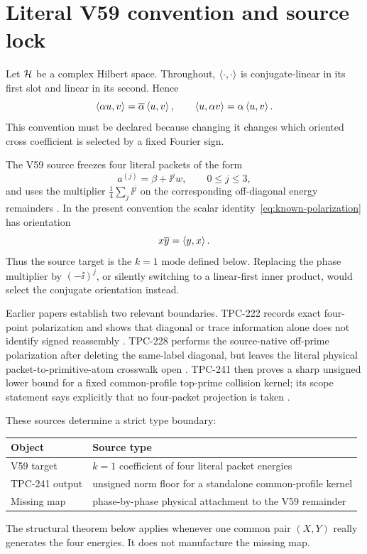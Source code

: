 \section{Literal V59 convention and source lock}\label{sec:source-lock}

Let $\mathcal{H}$ be a complex Hilbert space.  Throughout,
$\left\langle \cdot,\cdot\right\rangle$ is conjugate-linear in its first slot and linear in its
second.  Hence
\[
 \left\langle \alpha u,v\right\rangle=\overline\alpha\left\langle u,v\right\rangle,
 \qquad
 \left\langle u,\alpha v\right\rangle=\alpha\left\langle u,v\right\rangle.
\]
This convention must be declared because changing it changes which oriented
cross coefficient is selected by a fixed Fourier sign.

The V59 source freezes four literal packets of the form
\[
 a^{(j)}=\beta+\ii^j w,\qquad 0\leq j\leq3,
\]
and uses the multiplier $\frac14\sum_j\ii^j$ on the corresponding
off-diagonal energy remainders \cite{WangV59}.  In the present convention the
scalar identity~\eqref{eq:known-polarization} has orientation
\[
 x\overline y=\left\langle y,x\right\rangle.
\]
Thus the source target is the $k=1$ mode defined below.  Replacing the phase
multiplier by $(-\ii)^j$, or silently switching to a linear-first inner
product, would select the conjugate orientation instead.

Earlier papers establish two relevant boundaries.  TPC-222 records exact
four-point polarization and shows that diagonal or trace information alone
does not identify signed reassembly \cite{WangTPC222}.  TPC-228 performs the
source-native off-prime polarization after deleting the same-label diagonal,
but leaves the literal physical packet-to-primitive-atom crosswalk open
\cite{WangTPC228}.  TPC-241 then proves a sharp unsigned lower bound for a
fixed common-profile top-prime collision kernel; its scope statement says
explicitly that no four-packet projection is taken \cite{WangTPC241}.

These sources determine a strict type boundary:
\begin{center}
\begin{tabular}{@{}ll@{}}
\toprule
Object & Source type \\
\midrule
V59 target & $k=1$ coefficient of four literal packet energies \\
TPC-241 output & unsigned norm floor for a standalone common-profile kernel \\
Missing map & phase-by-phase physical attachment to the V59 remainder \\
\bottomrule
\end{tabular}
\end{center}
The structural theorem below applies whenever one common pair $(X,Y)$ really
generates the four energies.  It does not manufacture the missing map.
